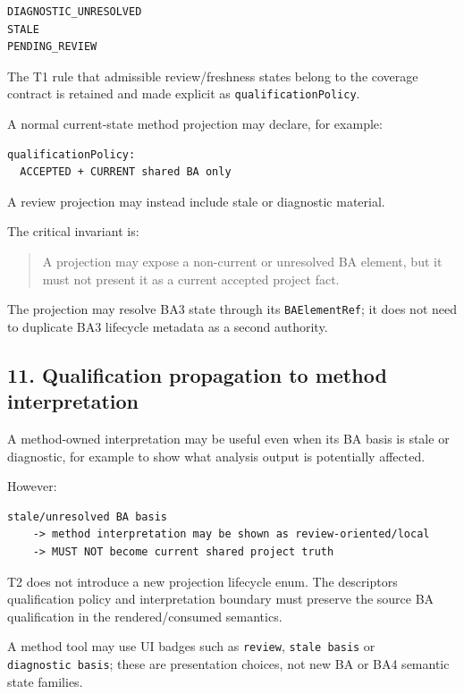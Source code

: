 \documentclass[11pt,a4paper]{article}
\begin{document}
\begin{verbatim}
DIAGNOSTIC_UNRESOLVED
STALE
PENDING_REVIEW
\end{verbatim}

The T1 rule that admissible review/freshness states belong to the
coverage contract is retained and made explicit as
\texttt{qualificationPolicy}.

A normal current-state method projection may declare, for example:

\begin{verbatim}
qualificationPolicy:
  ACCEPTED + CURRENT shared BA only
\end{verbatim}

A review projection may instead include stale or diagnostic material.

The critical invariant is:

\begin{quote}
A projection may expose a non-current or unresolved BA element, but it
must not present it as a current accepted project fact.
\end{quote}

The projection may resolve BA3 state through its \texttt{BAElementRef};
it does not need to duplicate BA3 lifecycle metadata as a second
authority.

\subsection{11. Qualification propagation to method
interpretation}\label{11-qualification-propagation-to-method-interpretation}

A method-owned interpretation may be useful even when its BA basis is
stale or diagnostic, for example to show what analysis output is
potentially affected.

However:

\begin{verbatim}
stale/unresolved BA basis
    -> method interpretation may be shown as review-oriented/local
    -> MUST NOT become current shared project truth
\end{verbatim}

T2 does not introduce a new projection lifecycle enum. The
descriptor\textquotesingle s qualification policy and interpretation
boundary must preserve the source BA qualification in the
rendered/consumed semantics.

A method tool may use UI badges such as \texttt{review},
\texttt{stale\ basis} or \texttt{diagnostic\ basis}; these are
presentation choices, not new BA or BA4 semantic state families.
\end{document}
